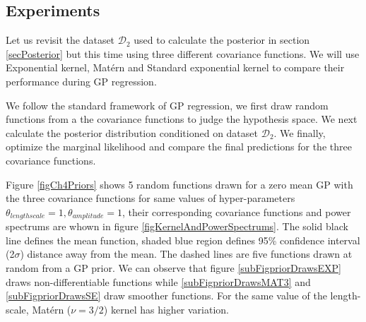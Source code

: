 \subsection{Experiments}
Let us revisit the dataset \(\mathcal{D}_{2}\) used to calculate the posterior in section \ref{secPosterior} but this time using three different covariance functions. We will use Exponential kernel, Mat\'ern and Standard exponential kernel to compare their performance during GP regression. 

We follow the standard framework of GP regression, we first draw random functions from a the covariance functions to judge the hypothesis space. We next calculate the posterior distribution conditioned on dataset \(\mathcal{D}_{2}\). We finally, optimize the marginal likelihood and compare the final predictions for the three covariance functions. 

Figure \ref{figCh4Priors} shows 5 random functions drawn for a zero mean GP with the three covariance functions for same values of hyper-parameters \(\theta_{lengthscale} = 1, \theta_{amplitude} = 1\), their corresponding covariance functions and power spectrums are whown in figure \ref{figKernelAndPowerSpectrums}. The solid black line defines the mean function, shaded blue region defines 95\% confidence interval (2\(\sigma\)) distance away from the mean. The dashed lines are five functions drawn at random from a GP prior. We can observe that figure \ref{subFigpriorDrawsEXP} draws non-differentiable functions while \ref{subFigpriorDrawsMAT3} and \ref{subFigpriorDrawsSE} draw smoother functions. For the same value of the length-scale, Mat\'ern (\(\nu=3/2\)) kernel has higher variation.


